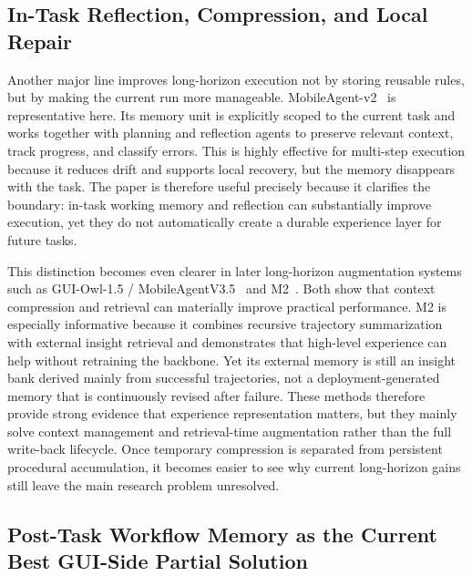 \documentclass{article}
\begin{document}
\subsection{In-Task Reflection, Compression, and Local Repair}\label{52-in-task-reflection-compression-and-local-repair}

Another major line improves long-horizon execution not by storing
reusable rules, but by making the current run more manageable.
MobileAgent-v2~\parencite{wang2024mobileagentv2mobiledeviceoperation} is representative
here. Its memory unit is explicitly scoped to the current task and
works together with planning and reflection agents to preserve relevant
context, track progress, and classify errors. This is highly effective
for multi-step execution because it reduces drift and supports local
recovery, but the memory disappears with the task. The paper is
therefore useful precisely because it clarifies the boundary: in-task
working memory and reflection can substantially improve execution, yet
they do not automatically create a durable experience layer for future
tasks.

This distinction becomes even clearer in later long-horizon augmentation
systems such as GUI-Owl-1.5 /
MobileAgentV3.5~\parencite{xu2026mobileagentv35multiplatformfundamentalgui} and
M2~\parencite{yan2026m2dualmemoryaugmentationlonghorizon}. Both show that context compression and
retrieval can materially improve practical performance. M2 is
especially informative because it combines recursive trajectory
summarization with external insight retrieval and demonstrates that
high-level experience can help without retraining the backbone. Yet its
external memory is still an insight bank derived mainly from successful
trajectories, not a deployment-generated memory that is continuously
revised after failure. These methods therefore provide strong evidence
that experience representation matters, but they mainly solve context
management and retrieval-time augmentation rather than the full
write-back lifecycle. Once temporary compression is separated from
persistent procedural accumulation, it becomes easier to see why
current long-horizon gains still leave the main research problem
unresolved.

\subsection{Post-Task Workflow Memory as the Current Best GUI-Side Partial Solution}\label{53-post-task-workflow-memory-as-the-current-best-gui-side-partial-solution}
\end{document}
